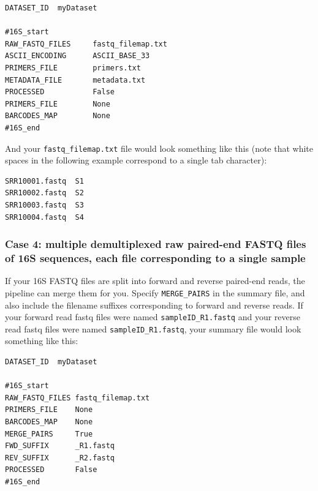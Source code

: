 \documentclass[11pt, oneside]{article}   	%
\begin{document}
\begin{verbatim}
DATASET_ID	myDataset

#16S_start
RAW_FASTQ_FILES     fastq_filemap.txt
ASCII_ENCODING      ASCII_BASE_33
PRIMERS_FILE        primers.txt
METADATA_FILE       metadata.txt
PROCESSED           False
PRIMERS_FILE        None
BARCODES_MAP        None
#16S_end
\end{verbatim}

And your {\tt fastq\_filemap.txt} file would look something like this (note that white spaces in the following example correspond to a single tab character):

\begin{verbatim}
SRR10001.fastq	S1
SRR10002.fastq	S2
SRR10003.fastq	S3
SRR10004.fastq	S4
\end{verbatim}

\subsubsection{Case 4: multiple demultiplexed raw paired-end FASTQ files of 16S sequences, each file corresponding to a single sample}
If your 16S FASTQ files are split into forward and reverse paired-end reads, the pipeline can merge them for you. Specify {\tt MERGE\_PAIRS} in the summary file, and also include the filename suffixes corresponding to forward and reverse reads. If your forward read fastq files were named {\tt sampleID\_R1.fastq} and your reverse read fastq files were named {\tt sampleID\_R1.fastq}, your summary file would look something like this:

\begin{verbatim}
DATASET_ID	myDataset

#16S_start
RAW_FASTQ_FILES fastq_filemap.txt
PRIMERS_FILE    None
BARCODES_MAP    None
MERGE_PAIRS	    True
FWD_SUFFIX      _R1.fastq
REV_SUFFIX      _R2.fastq
PROCESSED       False
#16S_end
\end{verbatim}
\end{document}
